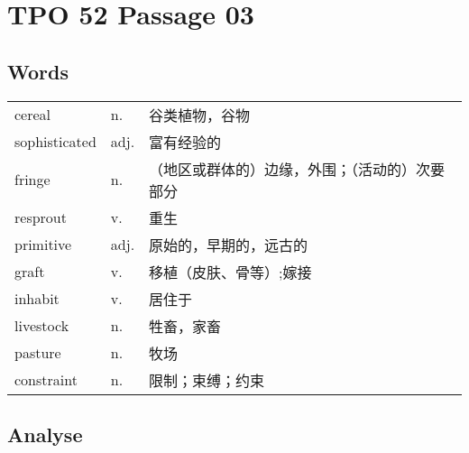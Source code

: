 \section{TPO 52 Passage 03}

\subsection{Words}

\begin{tabular}{lll}
    cereal        & n.   & 谷类植物，谷物                 \\
    sophisticated & adj. & 富有经验的                   \\
    fringe        & n.   & （地区或群体的）边缘，外围；（活动的）次要部分 \\
    resprout      & v.   & 重生                      \\
    primitive     & adj. & 原始的，早期的，远古的             \\
    graft         & v.   & 移植（皮肤、骨等）;嫁接            \\
    inhabit       & v.   & 居住于                     \\
    livestock     & n.   & 牲畜，家畜                   \\
    pasture       & n.   & 牧场                      \\
    constraint    & n.   & 限制；束缚；约束                \\
\end{tabular}

\subsection{Analyse}

